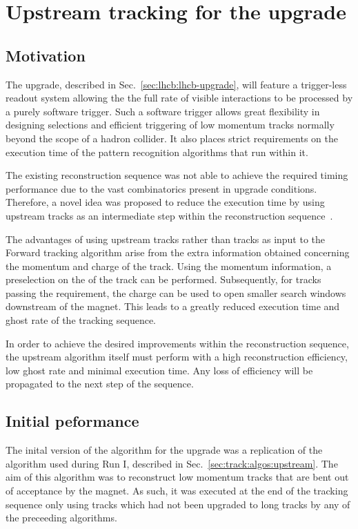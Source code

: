 \section{Upstream tracking for the \lhcb upgrade}
\label{sec:up-track-upgrade}

\subsection{Motivation}
\label{sec:up-track-upgrade:motivation}

The \lhcb upgrade, described in Sec.~\ref{sec:lhcb:lhcb-upgrade}, will feature a trigger-less readout system allowing the the full rate of visible interactions to be processed by a purely software trigger. Such a software trigger allows great flexibility in designing selections and efficient triggering of low momentum tracks normally beyond the scope of a hadron collider. It also places strict requirements on the execution time of the pattern recognition algorithms that run within it.

The existing reconstruction sequence was not able to achieve the required timing performance due to the vast combinatorics present in upgrade conditions. Therefore, a novel idea was proposed to reduce the execution time by using upstream tracks as an intermediate step within the reconstruction sequence~\cite{velout}.

The advantages of using upstream tracks rather than \velo tracks as input to the Forward tracking algorithm arise from the extra information obtained concerning the momentum and charge of the track. Using the momentum information, a preselection on the \pt of the track can be performed. Subsequently, for tracks passing the \pt requirement, the charge can be used to open smaller search windows downstream of the magnet. This leads to a greatly reduced execution time and ghost rate of the tracking sequence.

In order to achieve the desired improvements within the reconstruction sequence, the upstream algorithm itself must perform with a high reconstruction efficiency, low ghost rate and minimal execution time. Any loss of efficiency will be propagated to the next step of the sequence. 

\subsection{Initial peformance}

The inital version of the \velout algorithm for the \lhcb upgrade was a replication of the \velott algorithm used during Run I, described in Sec.~\ref{sec:track:algos:upstream}. The aim of this \velott algorithm was to reconstruct low momentum tracks that are bent out of acceptance by the magnet. As such, it was executed at the end of the tracking sequence only using \velo tracks which had not been upgraded to long tracks by any of the preceeding algorithms.

